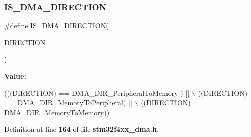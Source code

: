 \subsubsection{I\+S\+\_\+\+D\+M\+A\+\_\+\+D\+I\+R\+E\+C\+T\+I\+ON}
{\footnotesize\ttfamily \#define I\+S\+\_\+\+D\+M\+A\+\_\+\+D\+I\+R\+E\+C\+T\+I\+ON(\begin{DoxyParamCaption}\item[{}]{D\+I\+R\+E\+C\+T\+I\+ON }\end{DoxyParamCaption})}

{\bfseries Value\+:}
\begin{DoxyCode}
(((DIRECTION) == DMA_DIR_PeripheralToMemory ) || \(\backslash\)
                                     ((DIRECTION) == DMA_DIR_MemoryToPeripheral)  || \(\backslash\)
                                     ((DIRECTION) == DMA_DIR_MemoryToMemory))
\end{DoxyCode}


Definition at line \textbf{ 164} of file \textbf{ stm32f4xx\+\_\+dma.\+h}.

